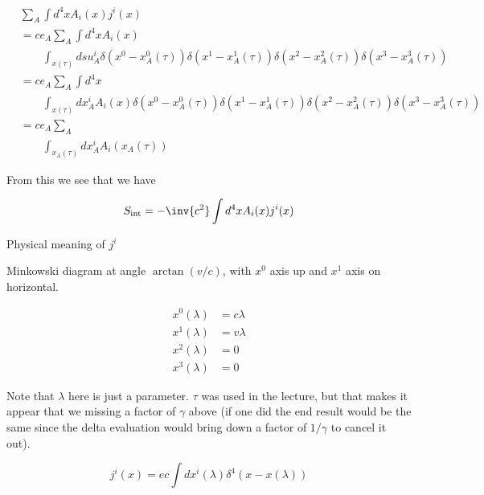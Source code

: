 \begin{equation}\label{eqn:relativisticElectrodynamicsL12b:610}
\begin{aligned}
&\sum_A \int d^4 x A_i(x) j^i(x) \\
&= 
c e_A \sum_A \int d^4 x A_i(x) \\
&\qquad \int_{x(\tau)}
ds u^i_A 
\delta(x^0 - x^0_A(\tau))
\delta(x^1 - x^1_A(\tau))
\delta(x^2 - x^2_A(\tau))
\delta(x^3 - x^3_A(\tau)) \\
&= 
c e_A \sum_A 
\int d^4 x \\
&\qquad \int_{x(\tau)}
dx^i_A 
A_i(x) 
\delta(x^0 - x^0_A(\tau))
\delta(x^1 - x^1_A(\tau))
\delta(x^2 - x^2_A(\tau))
\delta(x^3 - x^3_A(\tau)) \\
&=
c e_A \sum_A \\
&\qquad \int_{x_A(\tau)}
dx^i_A 
A_i(x_A(\tau)) 
\end{aligned}
\end{equation}

From this we see that we have

\begin{equation}\label{eqn:relativisticElectrodynamicsL12:430}
S_{\text{int}} = -\inv{c^2} \int d^4 x A_i(x) j^i(x) 
\end{equation}

Physical meaning of $j^i$

Minkowski diagram at angle $\arctan(v/c)$, with $x^0$ axis up and $x^1$ axis on horizontal.

\begin{equation}\label{eqn:relativisticElectrodynamicsL12:450}
\begin{aligned}
x^0(\lambda) &= c \lambda \\
x^1(\lambda) &= v \lambda \\
x^2(\lambda) &= 0 \\
x^3(\lambda) &= 0
\end{aligned}
\end{equation}

Note that $\lambda$ here is just a parameter.  $\tau$ was used in the lecture, but that makes it appear that we missing a factor of $\gamma$ above (if one did the end result would be the same since the delta evaluation would bring down a factor of $1/\gamma$ to cancel it out).

\begin{equation}\label{eqn:relativisticElectrodynamicsL12:470}
j^i(x) = e c \int dx^i(\lambda) \delta^4 (x - x(\lambda))
\end{equation}

